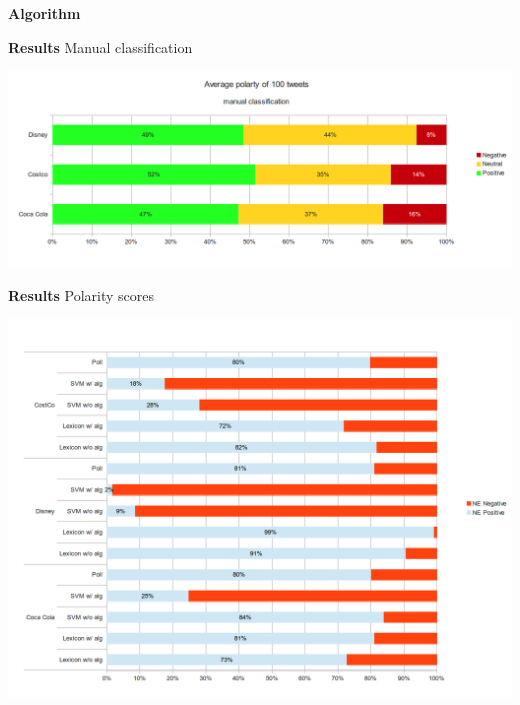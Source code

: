 \documentclass[landscape,20pt]{extarticle}
\newcommand*{\TitleFont}{\Huge \bf}
\begin{document}
\clearpage
\thispagestyle{empty}

{\TitleFont Algorithm}

\clearpage
\thispagestyle{empty}

{\TitleFont Results}
\newline
\small{Manual classification}
\newline
\newline
\newline
\newline
\centerline{\includegraphics[scale=0.85]{../img/man1.png}}

\clearpage
\thispagestyle{empty}

{\TitleFont Results}
\newline
\small{Polarity scores}
\newline
\centerline{\includegraphics[scale=0.7]{../img/full1.png}}




\clearpage
\thispagestyle{empty}
\end{document}
